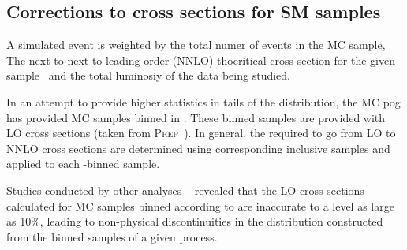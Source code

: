 \subsection{Corrections to cross sections for SM samples\label{sec:k-factors}}

A simulated event is weighted by the total numer of events in the MC sample, 
The next-to-next-to leading order (NNLO) thoeritical cross section for the given
sample~\cite{twiki-xs} and the total luminosiy of the data being studied.

In an attempt to provide higher statistics in tails of the \partonht distribution,
the MC pog has provided MC samples binned in \partonht. These binned
samples are provided with LO cross sections (taken from \textsc{Prep}~\cite{prep}). 
In general, the \kfactors required to go from LO to NNLO cross sections
are determined using corresponding inclusive samples and applied 
to each \partonht-binned sample. 

Studies conducted by other analyses ~\cite{RobXS} revealed that the LO cross
sections calculated for MC samples binned according to \partonht are
inaccurate to a level as large as 10\%, leading to non-physical
discontinuities in the \partonht distribution constructed from the
binned samples of a given process.  

